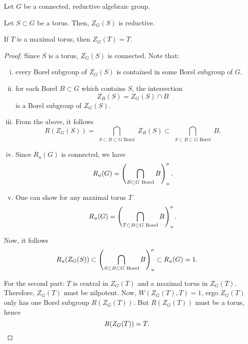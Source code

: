 \begin{proposition}
	Let $G$ be a connected, reductive algebraic group. 
	
	Let $S\subset G$ be a torus. Then, $Z_G(S)$ is reductive.
	
	If $T$ is a maximal torus, then $Z_G(T) = T$.
\end{proposition}
\begin{proof}
	Since $S$ is a torus, $Z_G(S)$ is connected. Note that:
	\begin{enumerate}[(i)]
		\item every Borel subgroup of $Z_G(S)$ is contained in some Borel subgroup of $G$.
		\item for each Borel $B \subset G$ which contains $S$, the intersection
		\[ Z_B(S) = Z_G(S) \cap B \]
		is a Borel subgroup of $Z_G(S)$.
		\item From the above, it follows
		\[R(Z_G(S)) = \bigcap_{\substack{S \subset B \subset G \text{ Borel} }} Z_B(S)  \subset \bigcap_{\substack{S \subset B \subset G \text{ Borel} }} B . \]
		\item Since $R_u(G)$ is connected, we have
		\[ R_u(G) = \left( \bigcap_{\substack{B \subset G \text{ Borel} }} B\right)_u^o. \]
		\item One can show for any maximal torus $T$
		\[ R_u(G) = \left( \bigcap_{\substack{T \subset B \subset G \text{ Borel} }} B\right)_u^o. \]
	\end{enumerate}
Now, it follows
\[ R_u(Z_G(S)) \subset \left( \bigcap_{\substack{S \subset B \subset G \text{ Borel} }} B\right)_u^o \subset R_u(G) = 1. \]

For the second part:
$T$ is central in $Z_G(T)$ and a maximal torus in $Z_G(T)$. Therefore, $Z_G(T)$ must be nilpotent. Now, $W(Z_G(T), T) = 1$, ergo $Z_G(T)$ only has one Borel subgroup $R(Z_G(T))$. But $R(Z_G(T))$ must be a torus, hence
\[ R(Z_G(T)) = T.\qedhere \]
\end{proof}